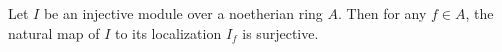 Let $I$ be an injective module over a noetherian ring $A$. Then for any $f \in A$, the natural map of $I$ to its localization $I_f$ is surjective.
